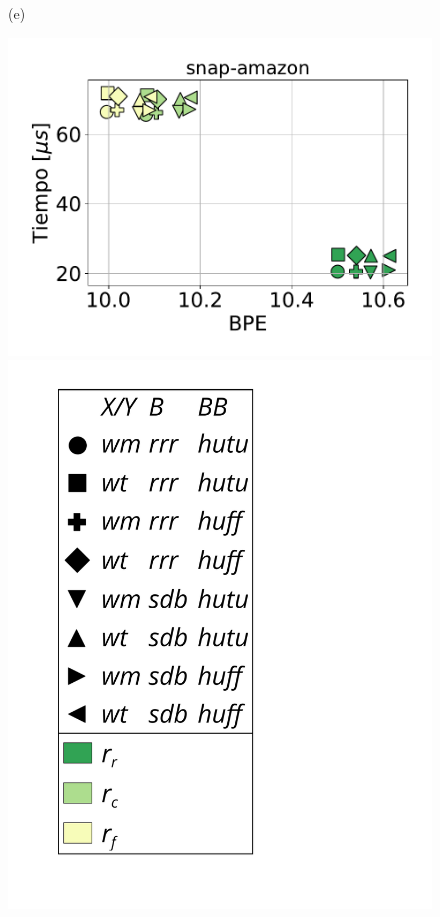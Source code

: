 \begin{figure}
\begin{minipage}{1\textwidth}
\begin{minipage}{0.45\textwidth}
    			(e)
    		\end{minipage}
    		\begin{minipage}{0.45\textwidth}
    			\centering
    			\begin{minipage}{0.75\textwidth}
    				\centering
    				\includegraphics[width=1\linewidth]{img/sdsl/aleatorio/snap-amazon.pdf}
    			\end{minipage}
    			\begin{minipage}{0.2\textwidth}
    				\centering
    				\includegraphics[scale=.16, clip, trim=70 0 0 0]{img/sdsl/label.pdf}
    			\end{minipage}
    			

\end{minipage}
\end{minipage}
\end{figure}
